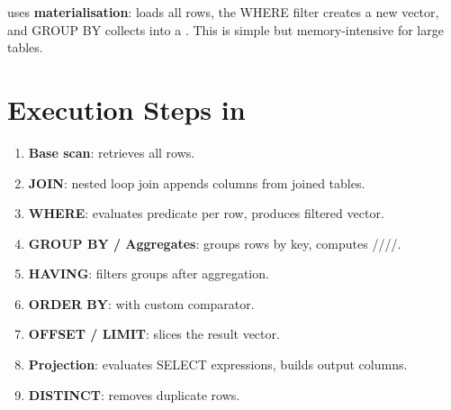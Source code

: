 \shiftdb{} uses \textbf{materialisation}:  loads all rows, the WHERE filter creates a new vector, and GROUP BY collects into a .  This is simple but memory-intensive for large tables.

\section{Execution Steps in }

\begin{enumerate}[nosep]
  \item \textbf{Base scan}:  retrieves all rows.
  \item \textbf{JOIN}: nested loop join appends columns from joined tables.
  \item \textbf{WHERE}: evaluates predicate per row, produces filtered vector.
  \item \textbf{GROUP BY / Aggregates}: groups rows by key, computes ////.
  \item \textbf{HAVING}: filters groups after aggregation.
  \item \textbf{ORDER BY}:  with custom comparator.
  \item \textbf{OFFSET / LIMIT}: slices the result vector.
  \item \textbf{Projection}: evaluates SELECT expressions, builds output columns.
  \item \textbf{DISTINCT}: removes duplicate rows.
\end{enumerate}

